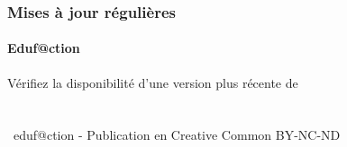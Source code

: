 \begin{frame}
\begin{columns}
\begin{column}{0.1\textwidth}
\begin{figure}
				  \end{figure}
		\end{column}
		\begin{column}{0.9\textwidth}
							
		\end{column}
\end{columns}
 \end{frame}
 
\begin{frame}
\frametitle{Mises à jour régulières}
\framesubtitle{Eduf@ction~\umaila}
{\begin{center} 
 {Vérifiez la disponibilité d'une version plus récente de} \\
 { }   \\ 
{{\huge\ccbyncndeu}}  \\  
{\the\year~eduf@ction - Publication en Creative Common BY-NC-ND }    \\  %
{\safeqrcode[padding]{\GITfilename}}  
\end{center} }
\end{frame}






